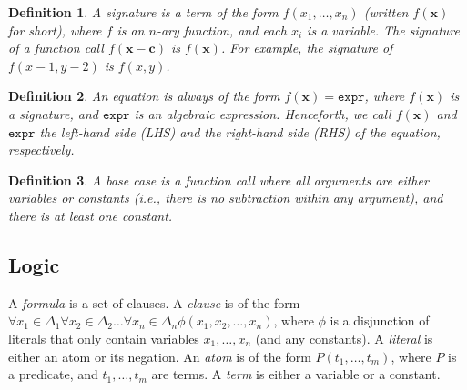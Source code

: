 \documentclass{article}
\newtheorem{definition}{Definition}
\newcommand{\expr}{\mathtt{expr}}
\begin{document}
\begin{definition}
  A \emph{signature} is a term of the form $f(x_{1}, \dots, x_{n})$ (written
  $f(\mathbf{x})$ for short), where $f$ is an $n$-ary function, and each $x_{i}$
  is a variable. The signature of a function call $f(\mathbf{x} - \mathbf{c})$
  is $f(\mathbf{x})$. For example, the signature of $f(x - 1, y - 2)$ is
  $f(x, y)$.
\end{definition}

\begin{definition}
  An \emph{equation} is always of the form $f(\mathbf{x}) = \expr{}$, where
  $f(\mathbf{x})$ is a signature, and $\expr{}$ is an algebraic expression.
  Henceforth, we call $f(\mathbf{x})$ and $\expr{}$ the left-hand side (LHS) and
  the right-hand side (RHS) of the equation, respectively.
\end{definition}

\begin{definition}
  A \emph{base case} is a function call where all arguments are either variables
  or constants (i.e., there is no subtraction within any argument), and there is
  at least one constant.
\end{definition}

\subsection{Logic}



A \emph{formula} is a set of clauses. A \emph{clause} is of the form
$\forall x_{1} \in \Delta_{1}\forall x_{2} \in \Delta_{2}\dots\forall x_{n} \in \Delta_{n} \phi(x_{1}, x_{2}, \dots, x_{n})$,
where $\phi$ is a disjunction of literals that only contain variables
$x_{1}, \dots, x_{n}$ (and any constants). A \emph{literal} is either an atom or
its negation. An \emph{atom} is of the form $P(t_{1}, \dots, t_{m})$, where $P$
is a predicate, and $t_{1}, \dots, t_{m}$ are terms. A \emph{term} is either a
variable or a constant.
\end{document}
